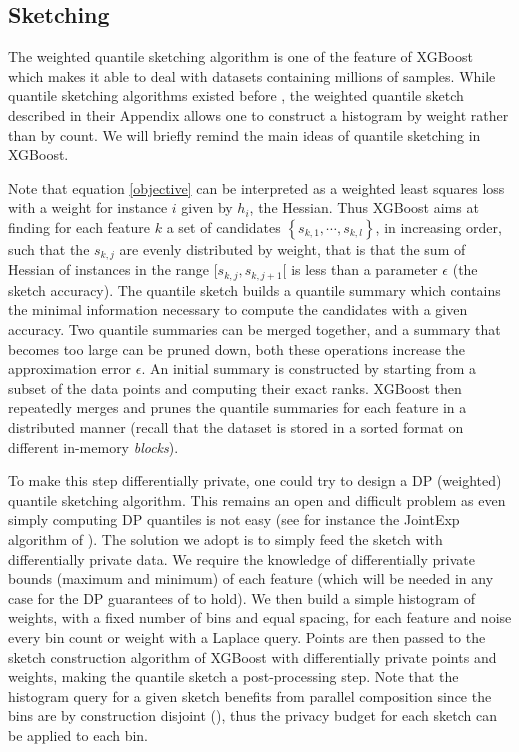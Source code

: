 \documentclass{article}
\theoremstyle{definition}
\begin{document}
\subsection{Sketching} 

The weighted quantile sketching algorithm is one of the feature of XGBoost which makes it able to deal with datasets containing millions of samples. While quantile sketching algorithms existed before \cite{chen2016xgboost}, the weighted quantile sketch described in their Appendix allows one to construct a histogram by weight rather than by count. We will briefly remind the main ideas of quantile sketching in XGBoost. \smallskip

Note that equation \ref{objective} can be interpreted as a weighted least squares loss with a weight for instance $i$ given by $h_i$, the Hessian. Thus XGBoost aims at finding for each feature $k$ a set of candidates $\left\{ s_{k,1}, \cdots, s_{k,l}\right\}$, in increasing order, such that the $s_{k,j}$ are evenly distributed by weight, that is that the sum of Hessian of instances in the range $[s_{k,j}, s_{k,j+1}[$ is less than a parameter $\epsilon$ (the sketch accuracy). The quantile sketch builds a quantile summary which contains the minimal information necessary to compute the candidates with a given accuracy. Two quantile summaries can be merged together, and a summary that becomes too large can be pruned down, both these operations increase the approximation error $\epsilon$. An initial summary is constructed by starting from a subset of the data points and computing their exact ranks. XGBoost then repeatedly merges and prunes the quantile summaries for each feature in a distributed manner (recall that the dataset is stored in a sorted format on different in-memory \textit{blocks}). \smallskip 

To make this step differentially private, one could try to design a DP (weighted) quantile sketching algorithm. This remains an open and difficult problem as even simply computing DP quantiles is not easy (see for instance the JointExp algorithm of \cite{gillenwater2021}). The solution we adopt is to simply feed the sketch with differentially private data. We require the knowledge of differentially private bounds (maximum and minimum) of each feature (which will be needed in any case for the DP guarantees of \cite{li2020privacy} to hold). We then build a simple histogram of weights, with a fixed number of bins and equal spacing, for each feature and noise every bin count or weight with a Laplace query. Points are then passed to the sketch construction algorithm of XGBoost with differentially private points and weights, making the quantile sketch a post-processing step. Note that the histogram query for a given sketch benefits from parallel composition since the bins are by construction disjoint (\cite{dwork2014}), thus the privacy budget for each sketch can be applied to each bin. \smallskip 
\end{document}
